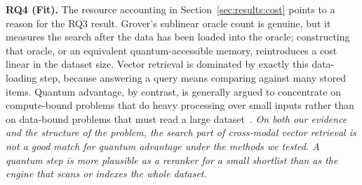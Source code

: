\textbf{RQ4 (Fit).} The resource accounting in
Section~\ref{sec:results:cost} points to a reason for the RQ3 result.
Grover's sublinear oracle count is genuine, but it measures the search after the
data has been loaded into the oracle; constructing that oracle, or an equivalent
quantum-accessible memory, reintroduces a cost linear in the dataset size. Vector
retrieval is dominated by exactly this data-loading step, because answering a
query means comparing against many stored items. Quantum advantage, by contrast,
is generally argued to concentrate on compute-bound problems that do heavy
processing over small inputs rather than on data-bound problems that must read a
large dataset~\cite{aaronson2015readfine,hoefler2023practicality}. \emph{On both
our evidence and the structure of the problem, the search part of cross-modal
vector retrieval is not a good match for quantum advantage under the methods we
tested. A quantum step is more plausible as a reranker for a small shortlist than
as the engine that scans or indexes the whole dataset.}

